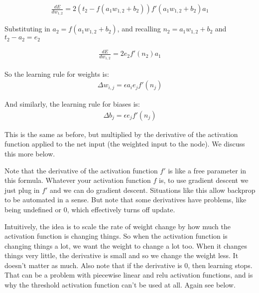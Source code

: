 \begin{eqnarray*}
\frac{dE}{dw_{1,2}} = 2 (t_2 - f(a_1w_{1,2} + b_2)) f'(a_1w_{1,2} + b_2) a_1 
\end{eqnarray*}

Substituting in $a_2 = f(a_1w_{1,2} + b_2)$, and recalling $n_2 = a_1w_{1,2} + b_2$  and $t_2 - a_2 = e_2$ 

\begin{eqnarray*}
\frac{dE}{dw_{1,2}}  = 2 e_2 f'(n_2) a_1 
\end{eqnarray*}

So the learning rule for weights is:
\begin{eqnarray*}
\Delta w_{i,j}  =  \epsilon a_i e_j f'(n_j)
\end{eqnarray*}

And similarly, the learning rule for biases is:
\begin{eqnarray*}
\Delta b_{j}  =  \epsilon e_j f'(n_j)
\end{eqnarray*} 

This is the same as before, but multiplied by the derivative of the activation function applied to the net input (the weighted input to the node). We discuss this more below. 

Note that the derivative of the activation function $f'$ is like a free parameter in this formula. Whatever your activation function $f$ is, to use gradient descent we just plug in $f'$ and we can do gradient descent. Situations like this allow backprop to be automated in a sense. But note that some derivatives have problems, like being undefined or 0, which effectively turns off update.

Intuitively, the idea is to scale the rate of weight change by how much the activation function is changing things. So when the activation function is changing things a lot, we want the weight to change a lot too. When it changes things very little, the derivative is small and so we change the weight less. It doesn't matter as much. Also note that if the derivative is 0, then learning stops. That can be a problem with piecewise linear and relu activation functions, and is why the threshold activation function can't be used at all. Again see below.

